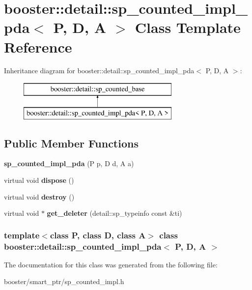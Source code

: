 \section{booster\-:\-:detail\-:\-:sp\-\_\-counted\-\_\-impl\-\_\-pda$<$ \-P, \-D, \-A $>$ \-Class \-Template \-Reference}
\label{classbooster_1_1detail_1_1sp__counted__impl__pda}
\-Inheritance diagram for booster\-:\-:detail\-:\-:sp\-\_\-counted\-\_\-impl\-\_\-pda$<$ \-P, \-D, \-A $>$\-:\begin{figure}[H]
\begin{center}
\leavevmode
\includegraphics[height=2.000000cm]{classbooster_1_1detail_1_1sp__counted__impl__pda}
\end{center}
\end{figure}
\subsection*{\-Public \-Member \-Functions}
\begin{DoxyCompactItemize}
\item 
{\bfseries sp\-\_\-counted\-\_\-impl\-\_\-pda} (\-P p, \-D d, \-A a)\label{classbooster_1_1detail_1_1sp__counted__impl__pda_a7c9dab83a3f29f6611fc274ff33b36e6}

\item 
virtual void {\bfseries dispose} ()\label{classbooster_1_1detail_1_1sp__counted__impl__pda_add9a4d9f11df14d9401b856f8ac89521}

\item 
virtual void {\bfseries destroy} ()\label{classbooster_1_1detail_1_1sp__counted__impl__pda_a756d031c3ba4c91cf5e7372c0323ab29}

\item 
virtual void $\ast$ {\bfseries get\-\_\-deleter} (detail\-::sp\-\_\-typeinfo const \&ti)\label{classbooster_1_1detail_1_1sp__counted__impl__pda_a01deec0dd9b1b2fee06e41eb110d8f73}

\end{DoxyCompactItemize}
\subsubsection*{template$<$class P, class D, class A$>$ class booster\-::detail\-::sp\-\_\-counted\-\_\-impl\-\_\-pda$<$ P, D, A $>$}



\-The documentation for this class was generated from the following file\-:\begin{DoxyCompactItemize}
\item 
booster/smart\-\_\-ptr/sp\-\_\-counted\-\_\-impl.\-h\end{DoxyCompactItemize}
